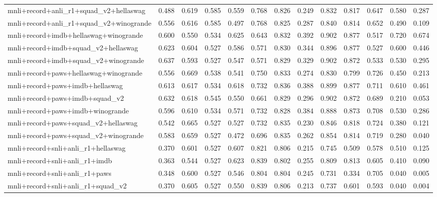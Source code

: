 \begin{table}[t]
\begin{tabular}{lrrrrrrrrrrrr}
    mnli+record+anli\_r1+squad\_v2+hellaswag & 0.488 & 0.619 & 0.585 & 0.559 & 0.768 & 0.826 & 0.249 & 0.832 & 0.817 & 0.647 & 0.580 & 0.287 \\
    mnli+record+anli\_r1+squad\_v2+winogrande & 0.556 & 0.616 & 0.585 & 0.497 & 0.768 & 0.825 & 0.287 & 0.840 & 0.814 & 0.652 & 0.490 & 0.109 \\
    mnli+record+imdb+hellaswag+winogrande & 0.600 & 0.550 & 0.534 & 0.625 & 0.643 & 0.832 & 0.392 & 0.902 & 0.877 & 0.517 & 0.720 & 0.674 \\
    mnli+record+imdb+squad\_v2+hellaswag & 0.623 & 0.604 & 0.527 & 0.586 & 0.571 & 0.830 & 0.344 & 0.896 & 0.877 & 0.527 & 0.600 & 0.446 \\
    mnli+record+imdb+squad\_v2+winogrande & 0.637 & 0.593 & 0.527 & 0.547 & 0.571 & 0.829 & 0.329 & 0.902 & 0.872 & 0.533 & 0.530 & 0.295 \\
    mnli+record+paws+hellaswag+winogrande & 0.556 & 0.669 & 0.538 & 0.541 & 0.750 & 0.833 & 0.274 & 0.830 & 0.799 & 0.726 & 0.450 & 0.213 \\
    mnli+record+paws+imdb+hellaswag & 0.613 & 0.617 & 0.534 & 0.618 & 0.732 & 0.836 & 0.388 & 0.899 & 0.877 & 0.711 & 0.610 & 0.461 \\
    mnli+record+paws+imdb+squad\_v2 & 0.632 & 0.618 & 0.545 & 0.550 & 0.661 & 0.829 & 0.296 & 0.902 & 0.872 & 0.689 & 0.210 & 0.053 \\
    mnli+record+paws+imdb+winogrande & 0.596 & 0.610 & 0.534 & 0.571 & 0.732 & 0.828 & 0.384 & 0.888 & 0.873 & 0.708 & 0.530 & 0.286 \\
    mnli+record+paws+squad\_v2+hellaswag & 0.542 & 0.665 & 0.527 & 0.527 & 0.732 & 0.835 & 0.230 & 0.846 & 0.818 & 0.724 & 0.380 & 0.121 \\
    mnli+record+paws+squad\_v2+winogrande & 0.583 & 0.659 & 0.527 & 0.472 & 0.696 & 0.835 & 0.262 & 0.854 & 0.814 & 0.719 & 0.280 & 0.040 \\
    mnli+record+snli+anli\_r1+hellaswag & 0.370 & 0.601 & 0.527 & 0.607 & 0.821 & 0.806 & 0.215 & 0.745 & 0.509 & 0.578 & 0.510 & 0.125 \\
    mnli+record+snli+anli\_r1+imdb & 0.363 & 0.544 & 0.527 & 0.623 & 0.839 & 0.802 & 0.255 & 0.809 & 0.813 & 0.605 & 0.410 & 0.090 \\
    mnli+record+snli+anli\_r1+paws & 0.348 & 0.600 & 0.527 & 0.546 & 0.804 & 0.804 & 0.245 & 0.731 & 0.334 & 0.705 & 0.040 & 0.005 \\
    mnli+record+snli+anli\_r1+squad\_v2 & 0.370 & 0.605 & 0.527 & 0.550 & 0.839 & 0.806 & 0.213 & 0.737 & 0.601 & 0.593 & 0.040 & 0.004 \\

\end{tabular}
\end{table}
